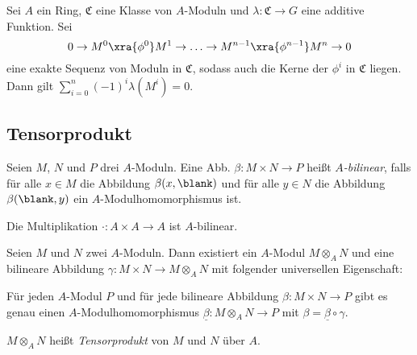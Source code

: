 \documentclass{cheat-sheet}
\newcommand{\SC}{\mathfrak{C}} %
\begin{document}
\begin{prop}
  Sei $A$ ein Ring, $\SC$ eine Klasse von $A$-Moduln und $\lambda : \SC \to G$ eine additive Funktion.
  Sei
  \[
    0 \to M^0 \xra{\phi^0} M^1 \to \ldots \to M^{n-1} \xra{\phi^{n-1}} M^n \to 0
  \]
  eine exakte Sequenz von Moduln in $\SC$, sodass auch die Kerne der $\phi^i$ in $\SC$ liegen.
  Dann gilt
  ${\sum}_{i=0}^n (-1)^i \lambda(M^i) = 0$.
\end{prop}

\subsection{Tensorprodukt}


\begin{defn}
  Seien $M$, $N$ und $P$ drei $A$-Moduln.
  Eine Abb. $\beta : M \times N \to P$ heißt \emph{$A$-bilinear}, falls für alle $x \in M$ die Abbildung $\beta(x, \blank)$ und für alle $y \in N$ die Abbildung $\beta(\blank, y)$ ein $A$-Modulhomomorphismus ist.
\end{defn}

\begin{bsp}
  Die Multiplikation $\cdot : A \times A \to A$ ist $A$-bilinear.
\end{bsp}

\begin{prop}
  Seien $M$ und $N$ zwei $A$-Moduln.
  Dann existiert ein $A$-Modul $M \otimes_A N$ und eine bilineare Abbildung $\gamma : M \times N \to M \otimes_A N$ mit folgender universellen Eigenschaft:

  \hfill\begin{minipage}{0.95 \linewidth}
    Für jeden $A$-Modul $P$ und für jede bilineare Abbildung $\beta : M \times N \to P$ gibt es genau einen $A$-Modulhomomorphismus $\underline{\beta} : M \otimes_A N \to P$ mit $\beta = \underline{\beta} \circ \gamma$.
  \end{minipage}
\end{prop}

\begin{defn}
  $M \otimes_A N$ heißt \emph{Tensorprodukt} von $M$ und $N$ über $A$.
\end{defn}
\end{document}
